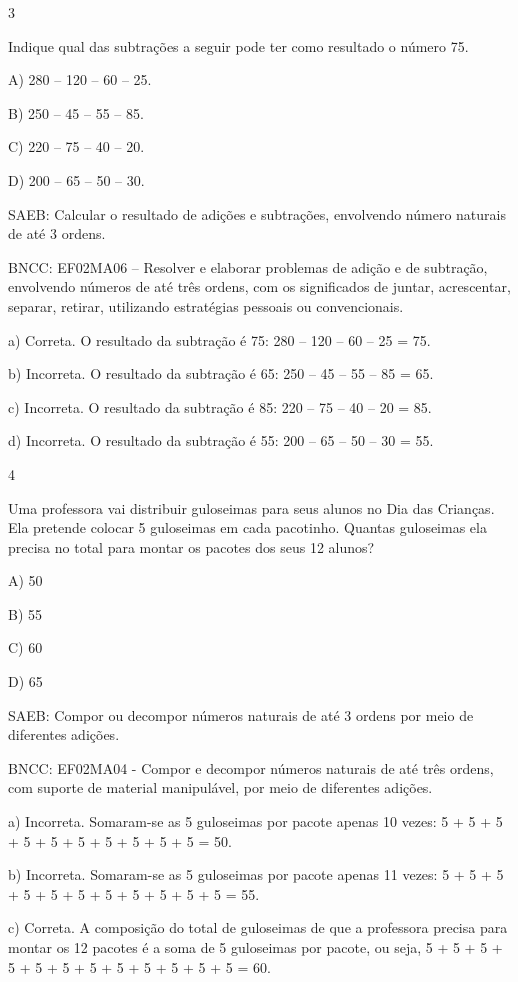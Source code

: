 \begin{escolha}
\begin{escolha}
{{{{{{{{\num{3}

Indique qual das subtrações a seguir pode ter como resultado o número 75.

A) 280 -- 120 -- 60 -- 25.

B) 250 -- 45 -- 55 -- 85.

C) 220 -- 75 -- 40 -- 20.

D) 200 -- 65 -- 50 -- 30.

SAEB: Calcular o resultado de adições e subtrações, envolvendo
número naturais de até 3 ordens.

BNCC: EF02MA06 -- Resolver e elaborar problemas de adição e de subtração,
envolvendo números de até três ordens, com os significados de juntar,
acrescentar, separar, retirar, utilizando estratégias pessoais ou convencionais.

a) Correta. O resultado da subtração é 75: 280 -- 120 -- 60 -- 25 = 75.

b) Incorreta. O resultado da subtração é 65: 250 -- 45 -- 55 -- 85 = 65.

c) Incorreta. O resultado da subtração é 85: 220 -- 75 -- 40 -- 20 = 85.

d) Incorreta. O resultado da subtração é 55: 200 -- 65 -- 50 -- 30 = 55.

\num{4}

Uma professora vai distribuir guloseimas para seus alunos no Dia das
Crianças. Ela pretende colocar 5 guloseimas em cada pacotinho. Quantas
guloseimas ela precisa no total para montar os pacotes dos seus 12
alunos?

A) 50

B) 55

C) 60

D) 65

SAEB: Compor ou decompor números naturais de até 3 ordens por meio de diferentes adições.

BNCC: EF02MA04 - Compor e decompor números naturais de até três ordens,
com suporte de material manipulável, por meio de diferentes adições.

a) Incorreta. Somaram-se as 5 guloseimas por pacote apenas 10 vezes: 5 + 5 +
5 + 5 + 5 + 5 + 5 + 5 + 5 + 5 = 50.

b) Incorreta. Somaram-se as 5 guloseimas por pacote apenas 11 vezes: 5 + 5 +
5 + 5 + 5 + 5 + 5 + 5 + 5 + 5 + 5 = 55.

c) Correta. A composição do total de guloseimas de que a professora precisa
para montar os 12 pacotes é a soma de 5 guloseimas por pacote, ou seja,
5 + 5 + 5 + 5 + 5 + 5 + 5 + 5 + 5 + 5 + 5 + 5 = 60.

}}}}}}}}
\end{escolha}
\end{escolha}

